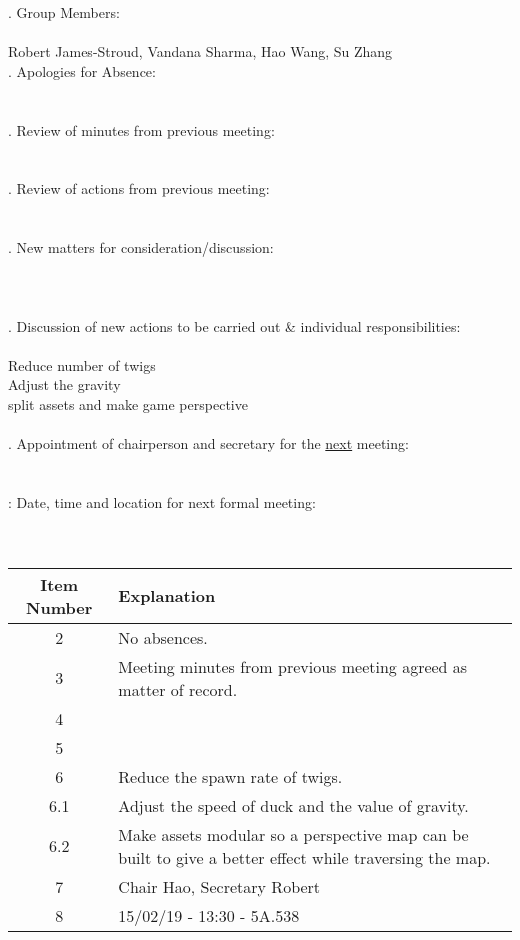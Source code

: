 \documentclass{article}
\begin{document}
. Group Members: \\\\ \indent Robert James-Stroud, Vandana Sharma, Hao Wang, Su Zhang \\

. Apologies for Absence: \\\\ \indent   \\

. Review of minutes from previous meeting: \\\\ \indent  \\

. Review of actions from previous meeting: \\\\ \indent \\

. New matters for consideration/discussion: \\\\ \indent \\
\indent  \\
. Discussion of new actions to be carried out \& individual responsibilities: \\\\ \indent Reduce number of twigs \\ \indent Adjust the gravity\\ \indent split assets and make game perspective \\\\

. Appointment of chairperson and secretary for the \underline{next} meeting: \\\\ \indent  \\

: Date, time and location for next formal meeting: \\\\ \indent  \\

\begin{table}[H]
	\centering
	\begin{tabular}{| c | p{9cm} |}
		\hline
		Item Number & Explanation \\ \hline
		2 & No absences.\\ \hline
		3 & Meeting minutes from previous meeting agreed as matter of record. \\ \hline
		4 & \\ \hline
		5 & \\ \hline
		6 & Reduce the spawn rate of twigs.\\ \hline
		6.1 & Adjust the speed of duck and the value of gravity. \\ \hline
		6.2 & Make assets modular so a perspective map can be built to give a better effect while traversing the map. \\ \hline
		7 & Chair Hao, Secretary Robert\\ \hline
		8 & 15/02/19 - 13:30 - 5A.538   \\ \hline

		
	\end{tabular}
\end{table}
\end{document}
